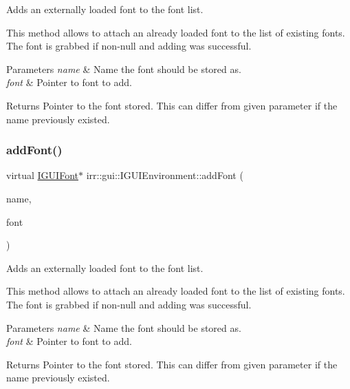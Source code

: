 Adds an externally loaded font to the font list. 

This method allows to attach an already loaded font to the list of existing fonts. The font is grabbed if non-\/null and adding was successful. 
\begin{DoxyParams}{Parameters}
{\em name} & Name the font should be stored as. \\
\hline
{\em font} & Pointer to font to add. \\
\hline
\end{DoxyParams}
\begin{DoxyReturn}{Returns}
Pointer to the font stored. This can differ from given parameter if the name previously existed. 
\end{DoxyReturn}
\mbox{\label{classirr_1_1gui_1_1IGUIEnvironment_a2c4fefb8a67fc92aedbbff6254532c2b}} 
\subsubsection{\texorpdfstring{add\+Font()}{addFont()}\hspace{0.1cm}{\footnotesize\ttfamily [2/2]}}
{\footnotesize\ttfamily virtual \hyperlink{classirr_1_1gui_1_1IGUIFont}{I\+G\+U\+I\+Font}$\ast$ irr\+::gui\+::\+I\+G\+U\+I\+Environment\+::add\+Font (\begin{DoxyParamCaption}\item[{const \hyperlink{namespaceirr_1_1io_a6468281622ce3a1c46b72e19f32dded5}{io\+::path} \&}]{name,  }\item[{\hyperlink{classirr_1_1gui_1_1IGUIFont}{I\+G\+U\+I\+Font} $\ast$}]{font }\end{DoxyParamCaption})\hspace{0.3cm}{\ttfamily [pure virtual]}}



Adds an externally loaded font to the font list. 

This method allows to attach an already loaded font to the list of existing fonts. The font is grabbed if non-\/null and adding was successful. 
\begin{DoxyParams}{Parameters}
{\em name} & Name the font should be stored as. \\
\hline
{\em font} & Pointer to font to add. \\
\hline
\end{DoxyParams}
\begin{DoxyReturn}{Returns}
Pointer to the font stored. This can differ from given parameter if the name previously existed. 
\end{DoxyReturn}
\mbox{\label{classirr_1_1gui_1_1IGUIEnvironment_a17114e35fc67f6d54df1baebb806f3b7}} 
